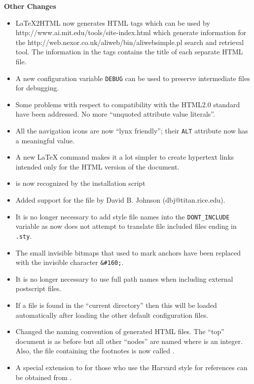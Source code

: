 \begin{htmllist}
\item[\textbf{Other Changes}] \hfill
\begin{itemize}
\item LaTeX2HTML now generates  HTML tags which can be used
by 
{http://www.ai.mit.edu/tools/site-index.html}
 which generate information for the 
{http://web.nexor.co.uk/aliweb/bin/aliwebsimple.pl} 
search and retrieval tool. The information in the  tags
contains
the title of each separate HTML file. 
\item A new configuration variable \texttt{DEBUG} can be used to preserve
intermediate files for debugging. 
\item Some problems with respect to compatibility with the HTML2.0 
standard have been addressed. No more ``unquoted attribute value literals''.
\item All the navigation icons are now ``lynx friendly''; their
\texttt{ALT} attribute now has a meaningful value.
\item A new LaTeX command  makes it a lot simpler
to create hypertext links intended only for the HTML version of
the document.
\item {} is now recognized by the installation script
\item Added support for the  file by 
David B. Johnson (dbj@titan.rice.edu).
\item It is no longer necessary to add style file names into the 
\texttt{DONT\_INCLUDE} variable as \latextohtml{} now does not
attempt to translate file included files ending in \texttt{.sty}.
\item The small invisible bitmaps that used to mark anchors have been
replaced with the invisible character \verb|&#160;|.
\item It is no longer necessary to use full path names when
including external postscript files.
\item If a file  is found in the ``current
directory'' then this will be loaded automatically after loading the
other default configuration files.
\item Changed the naming convention of generated HTML files. The
``top'' document is  as before but all other ``nodes''
are named  where  is an integer. Also, the file
containing
the footnotes is now called .
\item A special extension to \latextohtml{} for those who use the 
Harvard style for references can be obtained from
.
\end{itemize}
\end{htmllist}



